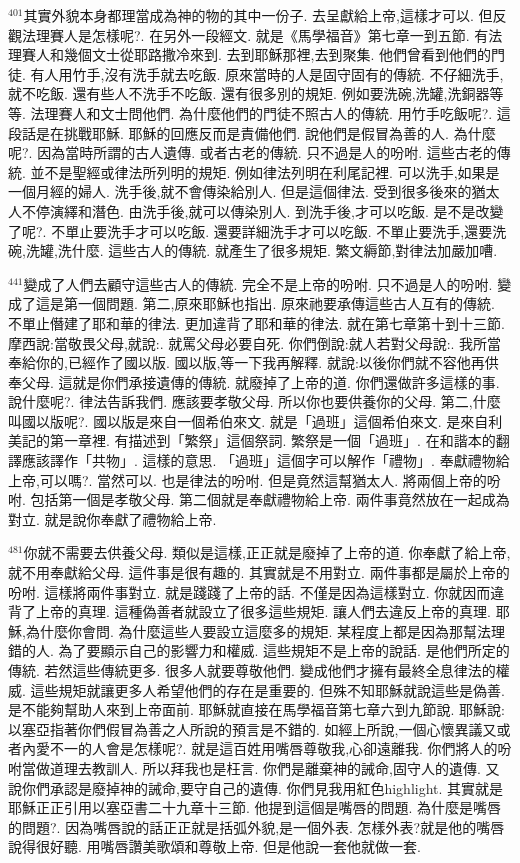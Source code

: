 \documentclass{book}
\begin{document}
$^{401}$其實外貌本身都理當成為神的物的其中一份子.
去呈獻給上帝,這樣才可以.
但反觀法理賽人是怎樣呢?.
在另外一段經文.
就是《馬學福音》第七章一到五節.
有法理賽人和幾個文士從耶路撒冷來到.
去到耶穌那裡,去到聚集.
他們曾看到他們的門徒.
有人用竹手,沒有洗手就去吃飯.
原來當時的人是固守固有的傳統.
不仔細洗手,就不吃飯.
還有些人不洗手不吃飯.
還有很多別的規矩.
例如要洗碗,洗罐,洗銅器等等.
法理賽人和文士問他們.
為什麼他們的門徒不照古人的傳統.
用竹手吃飯呢?.
這段話是在挑戰耶穌.
耶穌的回應反而是責備他們.
說他們是假冒為善的人.
為什麼呢?.
因為當時所謂的古人遺傳.
或者古老的傳統.
只不過是人的吩咐.
這些古老的傳統.
並不是聖經或律法所列明的規矩.
例如律法列明在利尾記裡.
可以洗手,如果是一個月經的婦人.
洗手後,就不會傳染給別人.
但是這個律法.
受到很多後來的猶太人不停演繹和潛色.
由洗手後,就可以傳染別人.
到洗手後,才可以吃飯.
是不是改變了呢?.
不單止要洗手才可以吃飯.
還要詳細洗手才可以吃飯.
不單止要洗手,還要洗碗,洗罐,洗什麼.
這些古人的傳統.
就產生了很多規矩.
繁文縟節,對律法加嚴加嘈.

$^{441}$變成了人們去顧守這些古人的傳統.
完全不是上帝的吩咐.
只不過是人的吩咐.
變成了這是第一個問題.
第二,原來耶穌也指出.
原來祂要承傳這些古人互有的傳統.
不單止僭建了耶和華的律法.
更加違背了耶和華的律法.
就在第七章第十到十三節.
摩西說:當敬畏父母,就說:.
就罵父母必要自死.
你們倒說:就人若對父母說:.
我所當奉給你的,已經作了國以版.
國以版,等一下我再解釋.
就說:以後你們就不容他再供奉父母.
這就是你們承接遺傳的傳統.
就廢掉了上帝的道.
你們還做許多這樣的事.
說什麼呢?.
律法告訴我們.
應該要孝敬父母.
所以你也要供養你的父母.
第二,什麼叫國以版呢?.
國以版是來自一個希伯來文.
就是「過班」這個希伯來文.
是來自利美記的第一章裡.
有描述到「繁祭」這個祭詞.
繁祭是一個「過班」.
在和諧本的翻譯應該譯作「共物」.
這樣的意思.
「過班」這個字可以解作「禮物」.
奉獻禮物給上帝,可以嗎?.
當然可以.
也是律法的吩咐.
但是竟然這幫猶太人.
將兩個上帝的吩咐.
包括第一個是孝敬父母.
第二個就是奉獻禮物給上帝.
兩件事竟然放在一起成為對立.
就是說你奉獻了禮物給上帝.

$^{481}$你就不需要去供養父母.
類似是這樣,正正就是廢掉了上帝的道.
你奉獻了給上帝,就不用奉獻給父母.
這件事是很有趣的.
其實就是不用對立.
兩件事都是屬於上帝的吩咐.
這樣將兩件事對立.
就是踐踐了上帝的話.
不僅是因為這樣對立.
你就因而違背了上帝的真理.
這種偽善者就設立了很多這些規矩.
讓人們去違反上帝的真理.
耶穌,為什麼你會問.
為什麼這些人要設立這麼多的規矩.
某程度上都是因為那幫法理錯的人.
為了要顯示自己的影響力和權威.
這些規矩不是上帝的說話.
是他們所定的傳統.
若然這些傳統更多.
很多人就要尊敬他們.
變成他們才擁有最終全息律法的權威.
這些規矩就讓更多人希望他們的存在是重要的.
但殊不知耶穌就說這些是偽善.
是不能夠幫助人來到上帝面前.
耶穌就直接在馬學福音第七章六到九節說.
耶穌說:以塞亞指著你們假冒為善之人所說的預言是不錯的.
如經上所說,一個心懷異議又或者內愛不一的人會是怎樣呢?.
就是這百姓用嘴唇尊敬我,心卻遠離我.
你們將人的吩咐當做道理去教訓人.
所以拜我也是枉言.
你們是離棄神的誡命,固守人的遺傳.
又說你們承認是廢掉神的誡命,要守自己的遺傳.
你們見我用紅色highlight.
其實就是耶穌正正引用以塞亞書二十九章十三節.
他提到這個是嘴唇的問題.
為什麼是嘴唇的問題?.
因為嘴唇說的話正正就是括弧外貌,是一個外表.
怎樣外表?就是他的嘴唇說得很好聽.
用嘴唇讚美歌頌和尊敬上帝.
但是他說一套他就做一套.
\end{document}
